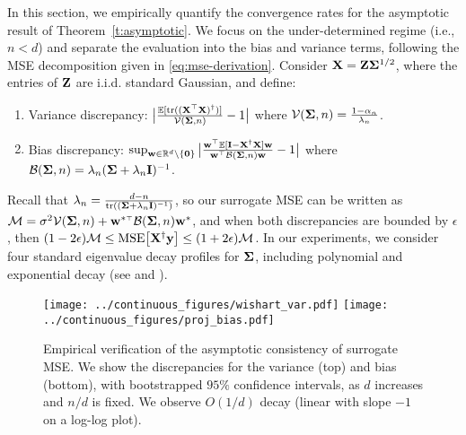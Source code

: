 In this section, we empirically quantify the convergence rates for
the asymptotic result of Theorem~\ref{t:asymptotic}.
We focus on the under-determined regime (i.e.,
$n<d$) and separate the evaluation into the bias and
variance terms, following the MSE decomposition given
in \eqref{eq:mse-derivation}. Consider  $\mathbf X = \mathbf Z\mathbf{\Sigma}^{1/2} $, where the entries of $\mathbf Z$ are
i.i.d. standard Gaussian, and define:\vspace{-1mm}
\begin{enumerate}
  \item Variance discrepancy:\quad
    $\big|\frac{\E[\tr((\X^\top\X)^\dagger)]}{\Vc(\Sigmab,n)}-1\big|$ where
    $\mathcal{V}(\mathbf{\Sigma},n)=\frac{1-\alpha_n}{\lambda_n}$.
  \item Bias discrepancy:\quad
     $\sup_{\w\in\R^d\backslash\{\zero\}}\big|\frac{\w^\top\E[\I-\X^\dagger\X]\w}
     {\w^\top\Bc(\Sigmab,n)\w} - 1\big|$
    where $\mathcal{B}(\mathbf{\Sigma},n) = \lambda_n(\mathbf{\Sigma}+\lambda_n\mathbf I)^{-1}$.
  \end{enumerate}\vspace{-1mm}
   Recall that $\lambda_n=\frac {d-n}{\mathrm{tr}((\mathbf{\Sigma}+\lambda_n\mathbf I)^{-1})}$,
so our surrogate MSE can be written as
$\Mc=\sigma^2\Vc(\Sigmab,n)+\w^{*\top}\Bc(\Sigmab,n)\w^*$, and when both
discrepancies are bounded by $\epsilon$, then $(1-2\epsilon)\mathcal M\leq{\mathrm{MSE}\big[\mathbf X^\dagger\mathbf y\big]}\leq (1+2\epsilon)\mathcal M$.
In our experiments, we consider four standard eigenvalue decay profiles
for $\mathbf{\Sigma}$, including polynomial and exponential decay (see
  and ).
\begin{figure} %
  \texttt{[image: ../continuous\_figures/wishart\_var.pdf]}
  \texttt{[image: ../continuous\_figures/proj\_bias.pdf]}
  \vspace{-.8cm}
  \caption{
    Empirical verification of the asymptotic consistency of surrogate MSE.
    We show the discrepancies for the variance (top) and bias
    (bottom),  with bootstrapped $95\%$ confidence intervals, as $d$
    increases and $n/d$ is fixed. We observe
     $O(1/d)$ decay (linear with slope $-1$ on a log-log plot).
  }
  \label{f:conj-wishart}
\end{figure}

